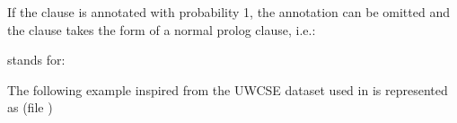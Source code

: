 \documentclass[letterpaper,10pt,english]{sphinxmanual}
\begin{document}
\begin{sphinxVerbatim}[commandchars=\\\{\}]
\end{sphinxVerbatim}

If the clause is annotated with probability 1, the annotation can be omitted and the clause takes
the form of a normal prolog clause, i.e.:

\begin{sphinxVerbatim}[commandchars=\\\{\}]
  
\end{sphinxVerbatim}

stands for:

\begin{sphinxVerbatim}[commandchars=\\\{\}]
  
\end{sphinxVerbatim}

The following example inspired from the UWCSE dataset used in  is represented as (file )
\end{document}
